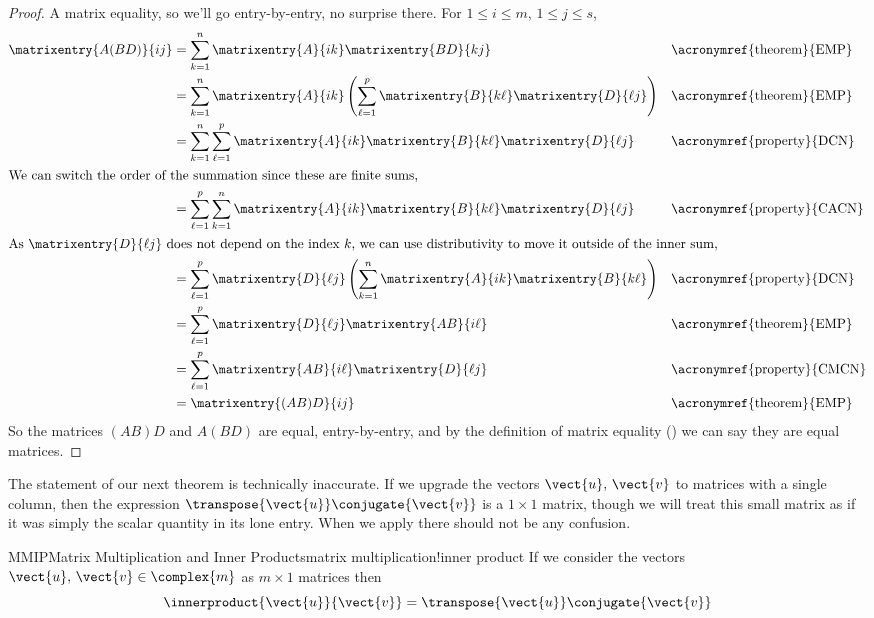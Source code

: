 \begin{proof}
A matrix equality, so we'll go entry-by-entry, no surprise there.    For $1\leq i\leq m$, $1\leq j\leq s$,
%
\begin{align*}
\matrixentry{A(BD)}{ij}
&=\sum_{k=1}^{n}\matrixentry{A}{ik}\matrixentry{BD}{kj}
&&\text{\acronymref{theorem}{EMP}}\\
&=\sum_{k=1}^{n}\matrixentry{A}{ik}\left(\sum_{\ell=1}^{p}\matrixentry{B}{k\ell}\matrixentry{D}{\ell j}\right)
&&\text{\acronymref{theorem}{EMP}}\\
&=\sum_{k=1}^{n}\sum_{\ell=1}^{p}\matrixentry{A}{ik}\matrixentry{B}{k\ell}\matrixentry{D}{\ell j}
&&\text{\acronymref{property}{DCN}}\\
%
\intertext{We can switch the order of the summation since these are finite sums,}
%
&=\sum_{\ell=1}^{p}\sum_{k=1}^{n}\matrixentry{A}{ik}\matrixentry{B}{k\ell}\matrixentry{D}{\ell j}
&&\text{\acronymref{property}{CACN}}\\
%
\intertext{As $\matrixentry{D}{\ell j}$ does not depend on the index $k$, we can use distributivity to move it outside of the inner sum,}
%
&=\sum_{\ell=1}^{p}\matrixentry{D}{\ell j}\left(\sum_{k=1}^{n}\matrixentry{A}{ik}\matrixentry{B}{k\ell}\right)
&&\text{\acronymref{property}{DCN}}\\
&=\sum_{\ell=1}^{p}\matrixentry{D}{\ell j}\matrixentry{AB}{i\ell}
&&\text{\acronymref{theorem}{EMP}}\\
&=\sum_{\ell=1}^{p}\matrixentry{AB}{i\ell}\matrixentry{D}{\ell j}
&&\text{\acronymref{property}{CMCN}}\\
&=\matrixentry{(AB)D}{ij}&&\text{\acronymref{theorem}{EMP}}
\end{align*}
%
So the matrices $(AB)D$ and $A(BD)$ are equal, entry-by-entry, and by the definition of matrix equality () we can say they are equal matrices.
%
\end{proof}
%
The statement of our next theorem is technically inaccurate.  If we upgrade the vectors $\vect{u},\,\vect{v}$ to matrices with a single column, then the expression $\transpose{\vect{u}}\conjugate{\vect{v}}$ is a $1\times 1$ matrix, though we will treat this small matrix as if it was simply the scalar quantity in its lone entry.  When we apply  there should not be any confusion.
%
\begin{theorem}{MMIP}{Matrix Multiplication and Inner Products}{matrix multiplication!inner product}
If we consider the vectors $\vect{u},\,\vect{v}\in\complex{m}$ as $m\times 1$ matrices then
%
\begin{equation*}
\innerproduct{\vect{u}}{\vect{v}}=\transpose{\vect{u}}\conjugate{\vect{v}}
\end{equation*}
%
\end{theorem}
